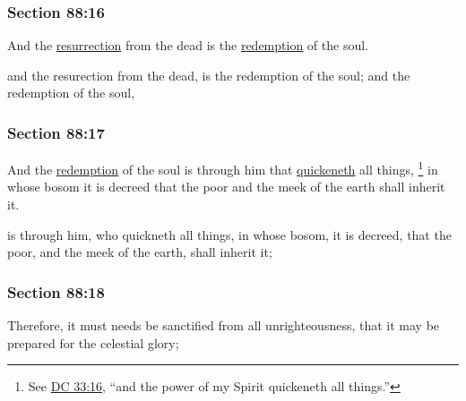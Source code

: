 	\subsubsection{Section 88:16} %
		\label{DC88-16}

		And the \hyperref[RESURRECTION]{resurrection} from the dead is the \hyperref[REDEMPTION]{redemption} of the soul.

		\begin{framed}
		\scriptsize
			\begin{compactdesc}
				\item[JSP] and the resurection from the dead, is the redemption of the soul; and the redemption of the soul,
			\end{compactdesc}
		\end{framed}

	\subsubsection{Section 88:17} %
		\label{DC88-17}

		And the \hyperref[REDEMPTION]{redemption} of the soul is through him that \hyperref[QUICKEN]{quickeneth} all things,%
		\footnote{%
			See \hyperref[DC33-16]{DC 33:16}, ``and the power of my Spirit quickeneth all things.''
			} 
		in whose bosom it is decreed that the poor and the meek of the earth shall inherit it.

		\begin{framed}
		\scriptsize
			\begin{compactdesc}
				\item[JSP] is through him, who quickneth all things, in whose bosom, it is decreed, that the poor, and the meek of the earth, shall inherit it;
			\end{compactdesc}
		\end{framed}

	\subsubsection{Section 88:18} %
		\label{DC88-18}

		Therefore, it must needs be sanctified from all unrighteousness, that it may be prepared for the celestial glory;

